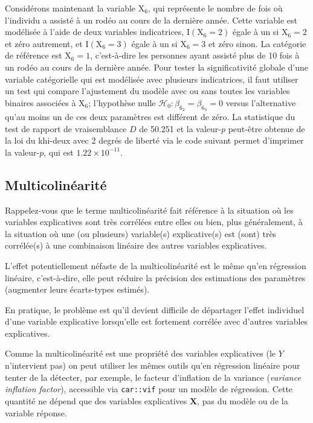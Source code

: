 \documentclass[
  11pt,
  letterpaper,
]{book}
\theoremstyle{definition}
\theoremstyle{remark}
\begin{document}
Considérons maintenant la variable \(\mathrm{X}_6\), qui représente le
nombre de fois où l'individu a assisté à un rodéo au cours de la
dernière année. Cette variable est modélisée à l'aide de deux variables
indicatrices, \(\mathrm{I}(\mathrm{X}_6=2)\) égale à un si
\(\mathrm{X}_6=2\) et zéro autrement, et \(\mathrm{I}(\mathrm{X}_6=3)\)
égale à un si \(\mathrm{X}_6=3\) et zéro sinon. La catégorie de
référence est \(\mathrm{X}_6=1\), c'est-à-dire les personnes ayant
assisté plus de 10 fois à un rodéo au cours de la dernière année. Pour
tester la significativité globale d'une variable catégorielle qui est
modélisée avec plusieurs indicatrices, il faut utiliser un test qui
compare l'ajustement du modèle avec ou sans toutes les variables
binaires associées à \(\mathrm{X}_6\); l'hypothèse nulle
\(\mathscr{H}_0: \beta_{6_{\texttt{2}}}=\beta_{6_{\texttt{3}}}=0\)
versus l'alternative qu'au moins un de ces deux paramètres est différent
de zéro. La statistique du test de rapport de vraisemblance \(D\) de
50.251 et la valeur-\(p\) peut-être obtenue de la loi du khi-deux avec 2
degrés de liberté via le code suivant permet d'imprimer la valeur-\(p\),
qui est \(1.22 \times 10^{-11}\).

\hypertarget{multicolinuxe9arituxe9}{%
\subsection{Multicolinéarité}\label{multicolinuxe9arituxe9}}

Rappelez-vous que le terme multicolinéarité fait référence à la
situation où les variables explicatives sont très corrélées entre elles
ou bien, plus généralement, à la situation où une (ou plusieurs)
variable(s) explicative(s) est (sont) très corrélée(s) à une combinaison
linéaire des autres variables explicatives.

L'effet potentiellement néfaste de la multicolinéarité est le même qu'en
régression linéaire, c'est-à-dire, elle peut réduire la précision des
estimations des paramètres (augmenter leurs écarts-types estimés).

En pratique, le problème est qu'il devient difficile de départager
l'effet individuel d'une variable explicative lorsqu'elle est fortement
corrélée avec d'autres variables explicatives.

Comme la multicolinéarité est une propriété des variables explicatives
(le \(Y\) n'intervient pas) on peut utiliser les mêmes outils qu'en
régression linéaire pour tenter de la détecter, par exemple, le facteur
d'inflation de la variance (\emph{variance inflation factor}),
accessible via \texttt{car::vif} pour un modèle de régression. Cette
quantité ne dépend que des variables explicatives \(\mathbf{X}\), pas du
modèle ou de la variable réponse.
\end{document}
